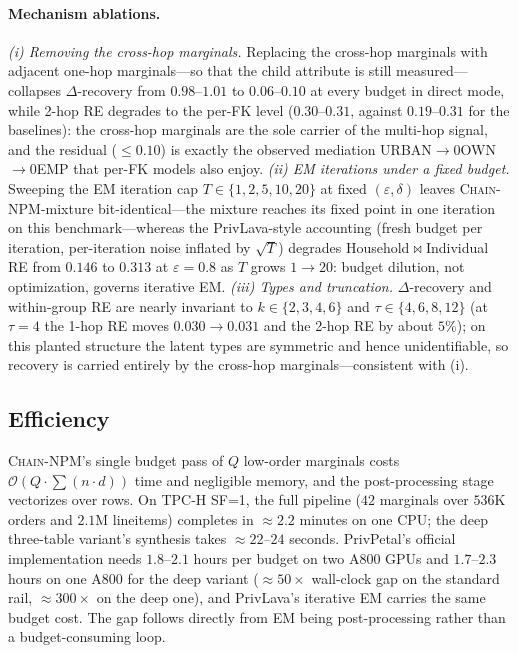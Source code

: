 \documentclass[sigconf, nonacm]{acmart}
\newcommand{\chainnpm}{\textsc{Chain-NPM}\xspace}
\begin{document}
\paragraph{Mechanism ablations.}
\emph{(i) Removing the cross-hop marginals.} Replacing the cross-hop
marginals with adjacent one-hop marginals---so that the child attribute is
still measured---collapses $\Delta$-recovery from $0.98$--$1.01$ to
$0.06$--$0.10$ at every budget in direct mode, while 2-hop RE degrades to
the per-FK level ($0.30$--$0.31$, against $0.19$--$0.31$ for the
baselines): the cross-hop marginals are the sole carrier of the multi-hop
signal, and the residual ($\le0.10$) is exactly the observed mediation
URBAN$\to$\penalty0OWN$\to$\penalty0EMP that per-FK models
also enjoy.
\emph{(ii) EM iterations under a fixed budget.} Sweeping the EM
iteration cap $T\in\{1,2,5,10,20\}$ at fixed $(\varepsilon,\delta)$
leaves \chainnpm-mixture bit-identical---the mixture reaches its fixed
point in one iteration on this benchmark---whereas the PrivLava-style
accounting (fresh budget per iteration, per-iteration noise inflated by
$\sqrt{T}$) degrades Household$\Join$Individual RE from
$0.146$ to $0.313$ at $\varepsilon{=}0.8$ as $T$ grows $1\to20$: budget
dilution, not optimization, governs iterative EM.
\emph{(iii) Types and truncation.}\label{sec:abl-types} $\Delta$-recovery and within-group
RE are nearly invariant to $k\in\{2,3,4,6\}$ and $\tau\in\{4,6,8,12\}$ (at
$\tau{=}4$ the 1-hop RE moves $0.030\to0.031$ and the 2-hop RE by about $5\%$); on this planted
structure the latent types are symmetric and hence unidentifiable, so
recovery is carried entirely by the cross-hop marginals---consistent
with (i).

\subsection{Efficiency}
\label{app:efficiency}
\chainnpm's single budget pass of $Q$ low-order marginals costs
$\mathcal{O}(Q \cdot \sum (n\cdot d))$ time and negligible memory, and
the post-processing stage vectorizes over rows. On TPC-H SF=1, the full
pipeline ($42$ marginals over $536$K orders and $2.1$M lineitems)
completes in $\approx 2.2$ minutes on one CPU; the deep
three-table variant's synthesis takes $\approx 22$--$24$ seconds. PrivPetal's
official implementation needs $1.8$--$2.1$ hours per budget on two A800 GPUs
and $1.7$--$2.3$ hours on one A800 for the deep variant ($\approx 50\times$
wall-clock gap on the standard rail, $\approx 300\times$ on the deep one), and
PrivLava's iterative EM carries the same budget cost.
The gap follows directly from EM being post-processing rather than a
budget-consuming loop.
\end{document}
